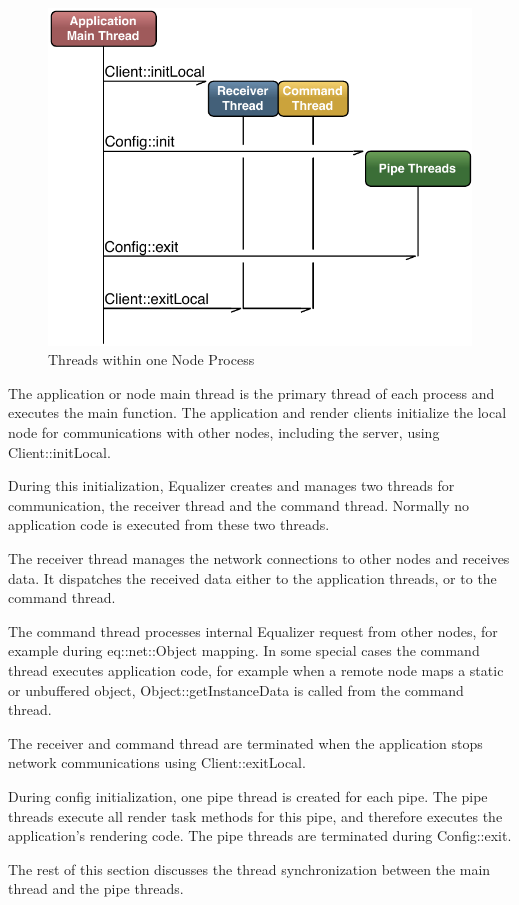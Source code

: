 \documentclass[10pt,a4]{scrartcl}
\begin{document}
\begin{figure}
  \includegraphics[width=.618\textwidth]{images/threads.pdf}
  {\caption{\label{fThreads}Threads within one Node Process}}
\end{figure}
The application or node main thread is the primary thread of each
process and executes the \textsf{main} function. The application and
render clients initialize the local node for communications with other
nodes, including the server, using \textsf{Client::initLocal}.

During this initialization, Equalizer creates and manages two threads
for communication, the receiver thread and the command thread. Normally
no application code is executed from these two threads.

The receiver thread manages the network connections to other nodes and
receives data. It dispatches the received data either to the application
threads, or to the command thread.

The command thread processes internal Equalizer request from other
nodes, for example during \textsf{eq::net::Object} mapping. In some
special cases the command thread executes application code, for example
when a remote node maps a static or unbuffered object,
\textsf{Object::getInstanceData} is called from the command thread.

The receiver and command thread are terminated when the application
stops network communications using \textsf{Client::exitLocal}.

During config initialization, one pipe thread is created for each
pipe. The pipe threads execute all render task methods for this pipe,
and therefore executes the application's rendering code. The pipe
threads are terminated during \textsf{Config::exit}.

The rest of this section discusses the thread synchronization between
the main thread and the pipe threads.
\end{document}
